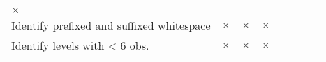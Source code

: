 \documentclass[]{article}
\begin{document}
\begin{longtable}[]{@{}lccccccc@{}}
\begin{minipage}[t]{0.06\columnwidth}
\(\times\)\strut
\end{minipage}\tabularnewline
\begin{minipage}[t]{0.33\columnwidth}\raggedright\strut
Identify prefixed and suffixed whitespace\strut
\end{minipage} & \begin{minipage}[t]{0.07\columnwidth}\centering\strut
\(\times\)\strut
\end{minipage} & \begin{minipage}[t]{0.07\columnwidth}\centering\strut
\(\times\)\strut
\end{minipage} & \begin{minipage}[t]{0.07\columnwidth}\centering\strut
\(\times\)\strut
\end{minipage} & \begin{minipage}[t]{0.07\columnwidth}\centering\strut
\strut
\end{minipage} & \begin{minipage}[t]{0.07\columnwidth}\centering\strut
\strut
\end{minipage} & \begin{minipage}[t]{0.06\columnwidth}\centering\strut
\strut
\end{minipage} & \begin{minipage}[t]{0.06\columnwidth}\centering\strut
\strut
\end{minipage}\tabularnewline
\begin{minipage}[t]{0.33\columnwidth}\raggedright\strut
Identify levels with \textless{} 6 obs.\strut
\end{minipage} & \begin{minipage}[t]{0.07\columnwidth}\centering\strut
\(\times\)\strut
\end{minipage} & \begin{minipage}[t]{0.07\columnwidth}\centering\strut
\(\times\)\strut
\end{minipage} & \begin{minipage}[t]{0.07\columnwidth}\centering\strut
\(\times\)\strut
\end{minipage} & \begin{minipage}[t]{0.07\columnwidth}\centering\strut
\strut
\end{minipage} & \begin{minipage}[t]{0.07\columnwidth}\centering\strut
\strut
\end{minipage} & \begin{minipage}[t]{0.06\columnwidth}\centering\strut
\strut
\end{minipage} & \begin{minipage}[t]{0.06\columnwidth}\centering\strut

\end{minipage}
\end{longtable}
\end{document}
